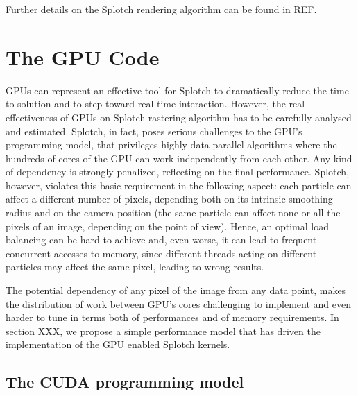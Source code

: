 \documentclass[11pt]{article}
\begin{document}
Further details on the Splotch rendering algorithm can be found in REF.

\section{The GPU Code}

GPUs can represent an effective tool for Splotch to dramatically 
reduce the time-to-solution and to step toward real-time interaction.
However, the real effectiveness of GPUs on Splotch rastering algorithm has to
be carefully analysed and estimated. Splotch, in fact, poses serious challenges 
to the GPU's programming model, that privileges highly data parallel algorithms 
where the hundreds of cores of the GPU can work independently from each other.
Any kind of dependency is strongly penalized, reflecting on the final performance.
Splotch, however, violates this basic requirement in the following aspect:
each particle can affect a different number of pixels, depending both on its intrinsic
smoothing radius and on the camera position (the same particle 
can affect none or all the pixels of an image, depending on the point of view). 
Hence, an optimal load balancing can be hard to achieve 
and, even worse, it can lead to frequent concurrent accesses to memory, since
different threads acting on different particles may affect the same pixel,
leading to wrong results.

The potential dependency of any pixel of the image from any data point,
makes the distribution of work between GPU's cores challenging to implement
and even harder to tune in terms both of performances and of memory requirements.
In section XXX, we propose a simple performance model that has
driven the implementation of the GPU enabled Splotch kernels.

\subsection{The CUDA programming model} 
\end{document}
